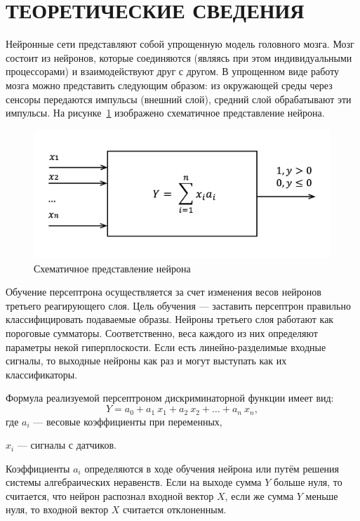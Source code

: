 \section{ТЕОРЕТИЧЕСКИЕ СВЕДЕНИЯ}

Нейронные сети представляют собой упрощенную модель головного мозга.
Мозг состоит из нейронов, которые соединяются (являясь при этом
индивидуальными процессорами) и взаимодействуют друг с другом.
В упрощенном виде работу мозга можно представить следующим образом:
из окружающей среды через сенсоры передаются импульсы (внешний слой),
средний слой обрабатывают эти импульсы. На рисунке~\ref{fig:neuron}
изображено схематичное представление нейрона.
\begin{figure}[h!]
  \centering
  \includegraphics[width=130mm]{img/neuron}
  \caption{Схематичное представление нейрона}
  \label{fig:neuron}
\end{figure}   

Обучение персептрона осуществляется за счет изменения весов нейронов
третьего реагирующего слоя. Цель обучения --– заставить персептрон
правильно классифицировать подаваемые образы.
Нейроны третьего слоя работают как пороговые сумматоры.
Соответственно, веса каждого из них определяют параметры некой гиперплоскости.
Если есть линейно-разделимые входные сигналы, то выходные нейроны
как раз и могут выступать как их классификаторы.

Формула реализуемой персептроном дискриминаторной функции имеет вид:
\begin{equation}
\label{eq:Y}
  Y = a_0 + a_1 \: x_1 + a_2 \: x_2 + \dots + a_n \: x_n,
\end{equation}
где \hspace{2mm} $a_i$ --- весовые коэффициенты при переменных, \par
$x_i$ --- сигналы с датчиков.

Коэффициенты $a_i$ определяются в ходе обучения нейрона или путём
решения системы алгебраических неравенств. Если на выходе сумма $Y$
больше нуля, то считается, что нейрон распознал входной вектор $X$,
если же сумма $Y$ меньше нуля, то входной вектор $X$ считается отклоненным.

\newpage